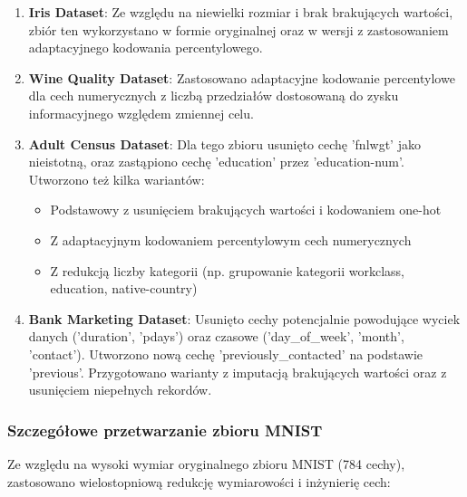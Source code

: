 \documentclass[11pt,a4paper]{article}
\begin{document}
\begin{enumerate}
    \item \textbf{Iris Dataset}: Ze względu na niewielki rozmiar i brak brakujących wartości, zbiór ten wykorzystano w formie oryginalnej oraz w wersji z zastosowaniem adaptacyjnego kodowania percentylowego.

    \item \textbf{Wine Quality Dataset}: Zastosowano adaptacyjne kodowanie percentylowe dla cech numerycznych z liczbą przedziałów dostosowaną do zysku informacyjnego względem zmiennej celu.

    \item \textbf{Adult Census Dataset}: Dla tego zbioru usunięto cechę 'fnlwgt' jako nieistotną, oraz zastąpiono cechę 'education' przez 'education-num'. Utworzono też kilka wariantów:
    \begin{itemize}
        \item Podstawowy z usunięciem brakujących wartości i kodowaniem one-hot
        \item Z adaptacyjnym kodowaniem percentylowym cech numerycznych
        \item Z redukcją liczby kategorii (np. grupowanie kategorii workclass, education, native-country)
    \end{itemize}

    \item \textbf{Bank Marketing Dataset}: Usunięto cechy potencjalnie powodujące wyciek danych ('duration', 'pdays') oraz czasowe ('day\_of\_week', 'month', 'contact'). Utworzono nową cechę 'previously\_contacted' na podstawie 'previous'. Przygotowano warianty z imputacją brakujących wartości oraz z usunięciem niepełnych rekordów.
\end{enumerate}

\subsubsection{Szczegółowe przetwarzanie zbioru MNIST}

Ze względu na wysoki wymiar oryginalnego zbioru MNIST (784 cechy), zastosowano wielostopniową redukcję wymiarowości i inżynierię cech:
\end{document}
